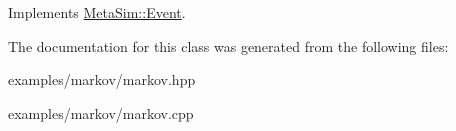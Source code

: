 Implements \hyperlink{classMetaSim_1_1Event_ac9621898eb5775271ca3e0197c27674a}{Meta\+Sim\+::\+Event}.



The documentation for this class was generated from the following files\+:\begin{DoxyCompactItemize}
\item 
examples/markov/markov.\+hpp\item 
examples/markov/markov.\+cpp\end{DoxyCompactItemize}
